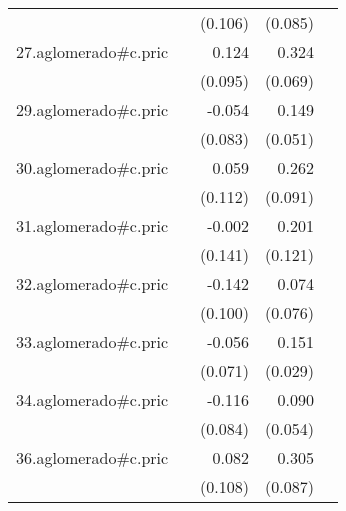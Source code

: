 {\begin{longtable}{l*{4}{D{.}{.}{-1}}}
            &                     &     (0.106)         &     (0.085)         &                     \\
\addlinespace
27.aglomerado#c.pric&                     &       0.124         &       0.324\sym{***}&                     \\
            &                     &     (0.095)         &     (0.069)         &                     \\
\addlinespace
29.aglomerado#c.pric&                     &      -0.054         &       0.149\sym{**} &                     \\
            &                     &     (0.083)         &     (0.051)         &                     \\
\addlinespace
30.aglomerado#c.pric&                     &       0.059         &       0.262\sym{**} &                     \\
            &                     &     (0.112)         &     (0.091)         &                     \\
\addlinespace
31.aglomerado#c.pric&                     &      -0.002         &       0.201         &                     \\
            &                     &     (0.141)         &     (0.121)         &                     \\
\addlinespace
32.aglomerado#c.pric&                     &      -0.142         &       0.074         &                     \\
            &                     &     (0.100)         &     (0.076)         &                     \\
\addlinespace
33.aglomerado#c.pric&                     &      -0.056         &       0.151\sym{***}&                     \\
            &                     &     (0.071)         &     (0.029)         &                     \\
\addlinespace
34.aglomerado#c.pric&                     &      -0.116         &       0.090         &                     \\
            &                     &     (0.084)         &     (0.054)         &                     \\
\addlinespace
36.aglomerado#c.pric&                     &       0.082         &       0.305\sym{***}&                     \\
            &                     &     (0.108)         &     (0.087)         &                     \\

\end{longtable}}
